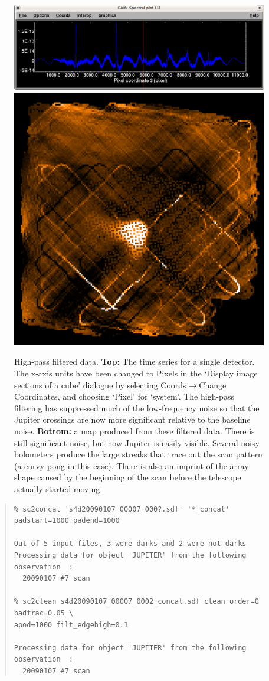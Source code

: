 \documentclass[twoside,11pt]{article}
\newenvironment{myquote}{\begin{quote}\begin{small}}{\end{small}\end{quote}}
\renewcommand{\_}{\texttt{\symbol{95}}}
\begin{document}
\begin{figure}
\begin{center}
\includegraphics[width=\linewidth]{spec_filt} \\
\vspace{0.3in}
\includegraphics[width=0.5\linewidth]{map_highpass}
\caption{High-pass filtered data. {\bf Top:} The time series for a
  single detector. The x-axis units have been changed to Pixels in the
  `Display image sections of a cube' dialogue by selecting
  Coords$\rightarrow$Change Coordinates, and choosing `Pixel' for
  `system'. The high-pass filtering has suppressed much of the
  low-frequency noise so that the Jupiter crossings are now more
  significant relative to the baseline noise. {\bf Bottom:} a map
  produced from these filtered data. There is still significant noise,
  but now Jupiter is easily visible. Several noisy bolometers produce
  the large streaks that trace out the scan pattern (a curvy pong in
  this case). There is also an imprint of the array shape caused by
  the beginning of the scan before the telescope actually started
  moving.}
\label{fig:highpass}
\end{center}
\end{figure}

\begin{myquote}
\begin{verbatim}
% sc2concat 's4d20090107_00007_000?.sdf' '*_concat' padstart=1000 padend=1000

Out of 5 input files, 3 were darks and 2 were not darks
Processing data for object 'JUPITER' from the following observation  :
  20090107 #7 scan

% sc2clean s4d20090107_00007_0002_concat.sdf clean order=0 badfrac=0.05 \
apod=1000 filt_edgehigh=0.1

Processing data for object 'JUPITER' from the following observation  :
  20090107 #7 scan
\end{verbatim}
\end{myquote}
\end{document}
